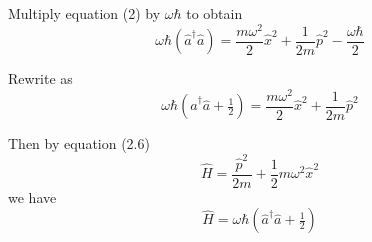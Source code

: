 \documentclass[12pt]{article}
\begin{document}
Multiply equation (2) by $\omega\hbar$ to obtain
\begin{equation*}
\omega\hbar\left(\hat a^\dag\hat a\right)=\frac{m\omega^2}{2}\hat x^2+\frac{1}{2m}\hat p^2-\frac{\omega\hbar}{2}
\end{equation*}

Rewrite as
\begin{equation*}
\omega\hbar\left(\hat a^\dag\hat a+\tfrac{1}{2}\right)
=\frac{m\omega^2}{2}\hat x^2+\frac{1}{2m}\hat p^2
\end{equation*}

Then by equation (2.6)
\begin{equation*}
\hat H=\frac{\hat p^2}{2m}+\frac{1}{2}m\omega^2\hat x^2
\tag{2.6}
\end{equation*}
we have
\begin{equation*}
\hat H=\omega\hbar\left(\hat a^\dag\hat a+\tfrac{1}{2}\right)
\end{equation*}
\end{document}
